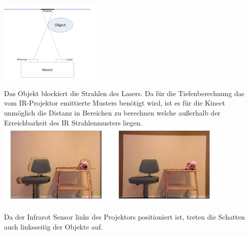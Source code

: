 \includegraphics[height=4cm]{Res/Schatten_Strahl.png}


Das Objekt blockiert die Strahlen des Lasers. Da für die Tiefenberechnung das vom IR-Projektor emittierte Musters benötigt wird, ist es für die Kinect unmöglich die Distanz in Bereichen zu berechnen welche außerhalb der Erreichbarkeit des IR Strahlenmusters liegen. \\

\includegraphics[height=4cm]{Res/Schatten.png}


Da der Infrarot Sensor links des Projektors positioniert ist, treten die Schatten auch linksseitig der Objekte auf. 
